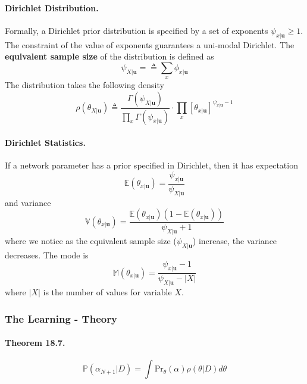 \documentclass[11pt]{article}
\newcommand{\bu}{\mathbf{u}}
\newcommand{\pr}{\mathrm{Pr}}
\begin{document}
\paragraph{Dirichlet Distribution.} Formally, a Dirichlet prior distribution is specified by a set of exponents $\psi_{x | \bu} \geq 1$. The constraint of the value of exponents guarantees a uni-modal Dirichlet. The \textbf{equivalent sample size} of the distribution is defined as 
\begin{equation}
	\psi_{X | \bu}  = \triangleq \sum_ x \phi_{x | \bu}
\end{equation}
The distribution takes the following density
\begin{equation}
	\rho ( \theta _ { X | \bu } ) \triangleq \frac{\Gamma (\psi _ {X | \bu} )}{\prod _ x \Gamma (\psi _ {x | \bu}) } \cdot  \prod_x \left[ \theta _ {x | \bu} \right] ^{\psi_{x | \bu} - 1}
\end{equation}

\paragraph{Dirichlet Statistics.}
If a network parameter has a prior specified in Dirichlet, then it has expectation
\begin{equation}
	\mathbb E ( \theta _{x | \bu} ) = \frac{\psi _ {x | \bu}}{\psi _ {X | \bu}}
\end{equation}
and variance 
\begin{equation}
	\mathbb V (\theta _{x | \bu} ) = \frac{\mathbb E ( \theta _{x | \bu} ) ( 1- \mathbb E ( \theta _{x | \bu} ))}{\psi_{X | \bu } + 1}
\end{equation}
where we notice as the equivalent sample size ($\psi_{X | \bu }$) increase, the variance decreases. The mode is 
\begin{equation}
	\mathbb M ( \theta _{x | \bu} ) = \frac{\psi_{x | \bu} - 1}{\psi _{X | \bu} - |X|}
\end{equation}
where $|X|$ is the number of values for variable $X$. 

\subsubsection{The Learning - Theory}
\paragraph{Theorem 18.7.} 
\begin{equation}
	\mathbb P (\alpha _{N + 1} | D ) = \int \pr_\theta ( \alpha ) \rho ( \theta | D) d \theta
\end{equation}
\end{document}

